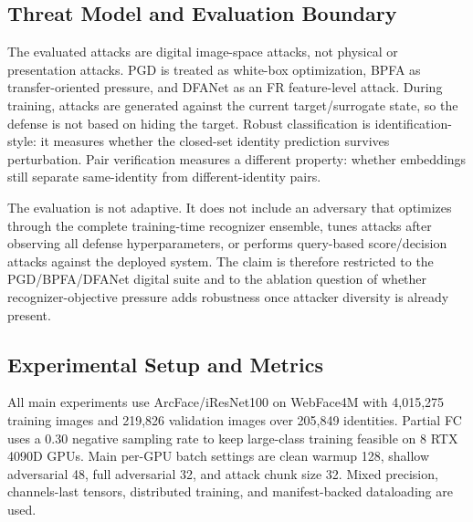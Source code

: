 \documentclass[conference]{IEEEtran}
\begin{document}
\subsection{Threat Model and Evaluation Boundary}
The evaluated attacks are digital image-space attacks, not physical or
presentation attacks. PGD is treated as white-box optimization, BPFA as
transfer-oriented pressure, and DFANet as an FR feature-level attack. During
training, attacks are generated against the current target/surrogate state, so
the defense is not based on hiding the target. Robust classification is
identification-style: it measures whether the closed-set identity prediction
survives perturbation. Pair verification measures a different property:
whether embeddings still separate same-identity from different-identity pairs.

The evaluation is not adaptive. It does not include an adversary that optimizes
through the complete training-time recognizer ensemble, tunes attacks after
observing all defense hyperparameters, or performs query-based score/decision
attacks against the deployed system. The claim is therefore restricted to the
PGD/BPFA/DFANet digital suite and to the ablation question of whether
recognizer-objective pressure adds robustness once attacker diversity is already
present.

\subsection{Experimental Setup and Metrics}
All main experiments use ArcFace/iResNet100 on WebFace4M with 4,015,275
training images and 219,826 validation images over 205,849 identities. Partial
FC uses a 0.30 negative sampling rate to keep large-class training feasible on
8 RTX 4090D GPUs. Main per-GPU batch settings are clean warmup 128, shallow
adversarial 48, full adversarial 32, and attack chunk size 32. Mixed precision,
channels-last tensors, distributed training, and manifest-backed dataloading
are used.
\end{document}
